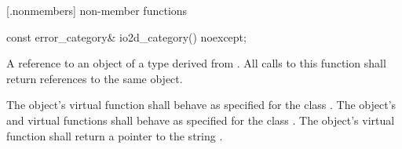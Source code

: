  [\iotwoderrorcategory.nonmembers] { 
non-member functions}

\begin{itemdecl}
  const error_category& io2d_category() noexcept;
\end{itemdecl}
\begin{itemdescr}
	\pnum
	\returns
	A reference to an object of a type derived from . All 
	calls to this function shall return references to the same object.
	
	\pnum
	\remarks
	The object's  virtual function shall behave 
	as specified for the class . The object's 
	 and  
	virtual functions shall behave as specified for the class 
	. The object's  virtual function 
	shall return a pointer to the string .
\end{itemdescr}
